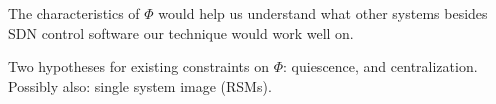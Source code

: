 The characteristics of $\Phi$ would help us understand what other systems besides
SDN control software our technique would work well on.

Two hypotheses for existing constraints on $\Phi$: quiescence, and
centralization. Possibly also: single system image (RSMs).
